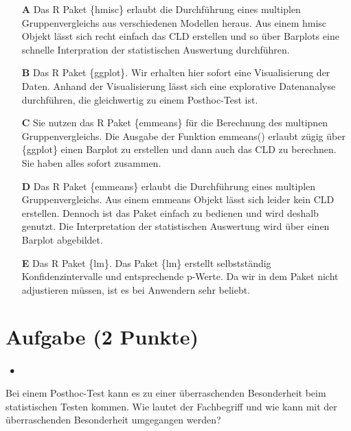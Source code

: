 \documentclass[a4paper, 9pt]{scrartcl}\usepackage[]{graphicx}\usepackage[]{xcolor}
\begin{document}
\begin{enumerate}
\item [\textbf{A} \msquare] Das R Paket \{hmisc\} erlaubt die Durchführung eines multiplen Gruppenvergleichs aus verschiedenen Modellen heraus. Aus einem hmisc Objekt lässt sich recht einfach das CLD erstellen und so über Barplots eine schnelle Interpration der statistischen Auswertung durchführen.
\item [\textbf{B} \msquare] Das R Paket \{ggplot\}. Wir erhalten hier sofort eine Visualisierung der Daten. Anhand der Visualisierung lässt sich eine explorative Datenanalyse durchführen, die gleichwertig zu einem Posthoc-Test ist.
\item [\textbf{C} \msquare] Sie nutzen das R Paket \{emmeans\} für die Berechnung des multipnen Gruppenvergleichs. Die Ausgabe der Funktion emmeans() erlaubt zügig über \{ggplot\} einen Barplot zu erstellen und dann auch das CLD zu berechnen. Sie haben alles sofort zusammen.
\item [\textbf{D} \msquare] Das R Paket \{emmeans\} erlaubt die Durchführung eines multiplen Gruppenvergleichs. Aus einem emmeans Objekt lässt sich leider kein CLD erstellen. Dennoch ist das Paket einfach zu bedienen und wird deshalb genutzt. Die Interpretation der statistischen Auswertung wird über einen Barplot abgebildet.
\item [\textbf{E} \msquare] Das R Paket \{lm\}. Das Paket \{lm\} erstellt selbstständig Konfidenzintervalle und entsprechende p-Werte. Da wir in dem Paket nicht adjustieren müssen, ist es bei Anwendern sehr beliebt.
\end{enumerate}

\section{Aufgabe \hfill (2 Punkte)}

\ifcollection
\begin{flushright}
\tiny\vspace{-2Ex}
\textbf{\examinhaltstart}
\exammodulestatversuch $\;\bullet$
\exammodulebiostat
\vspace{-1Ex}
\end{flushright}
\fi




Bei einem Posthoc-Test kann es zu einer überraschenden Besonderheit beim statistischen Testen kommen. Wie lautet der Fachbegriff und wie kann mit der überraschenden Besonderheit umgegangen werden?
\end{document}
